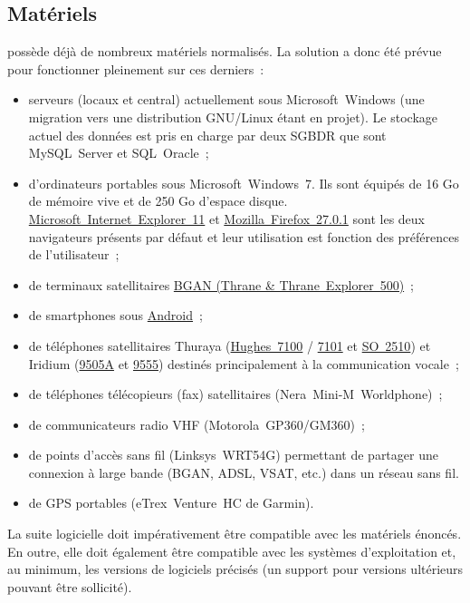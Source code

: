 \subsection{Matériels}
\mo possède déjà de nombreux matériels normalisés. La solution a donc été prévue pour fonctionner pleinement sur ces derniers~:
\begin{itemize}
	\item serveurs (locaux et central) actuellement sous Microsoft~Windows (une migration vers une distribution GNU/Linux étant en projet). Le stockage actuel des données est pris en charge par deux SGBDR que sont MySQL~Server et SQL~Oracle~;
	\item d'ordinateurs portables sous Microsoft~Windows~7. Ils sont équipés de 16 Go de mémoire vive et de 250 Go d'espace disque. \href{https://www.microsoft.com/fr-fr/download/internet-explorer.aspx}{Microsoft~Internet~Explorer~11} et \href{http://www.mozilla.org/en-US/firefox/27.0.1/releasenotes/}{Mozilla~Firefox~27.0.1} sont les deux navigateurs présents par défaut et leur utilisation est fonction des préférences de l'utilisateur~;
	\item de terminaux satellitaires \href{http://explorersatellite.com/BGAN/thrane_thrane_bgan.html}{BGAN (Thrane \& Thrane~Explorer~500)}~;
	\item de smartphones sous \href{http://www.android.com/}{Android}~;
	\item de téléphones satellitaires Thuraya (\href{http://www.thuraya.com.kw/hughes7101.html}{Hughes~7100} / \href{http://www.thuraya.com.kw/hughes7100.html}{7101} et \href{http://www.thuraya.com.kw/so-2510.html}{SO~2510}) et Iridium (\href{http://www.iridium.com/products/Iridium-9505A-Satellite-Phone.aspx}{9505A} et \href{http://www.iridium.com/products/Iridium9555SatellitePhone.aspx}{9555}) destinés principalement à la communication vocale~;
	\item de téléphones télécopieurs (fax) satellitaires (Nera~Mini-M~Worldphone)~;
	\item de communicateurs radio VHF (Motorola~GP360/GM360)~;
	\item de points d'accès sans fil (Linksys~WRT54G) permettant de partager une connexion à large bande (BGAN, ADSL, VSAT, etc.) dans un réseau sans fil.
	\item de GPS portables (eTrex~Venture~HC de Garmin).
\end{itemize}
\begin{constraint}
La suite logicielle doit impérativement être compatible avec les matériels énoncés. En outre, elle doit également être compatible avec les systèmes d'exploitation et, au minimum, les versions de logiciels précisés (un support pour versions ultérieurs pouvant être sollicité).
\end{constraint}
